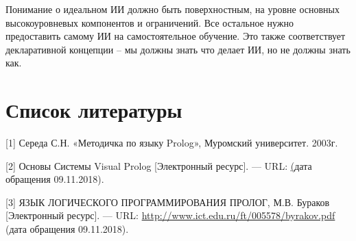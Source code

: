 \documentclass[14pt,a4paper,report]{report}
\begin{document}
Понимание о идеальном ИИ должно быть поверхностным, на уровне основных высокоуровневых компонентов и ограничений. Все остальное нужно предоставить самому ИИ на самостоятельное обучение. Это также соответствует декларативной концепции -- мы должны знать что делает ИИ, но не должны знать как.

\section{Список литературы}


\begin{flushleft}
	
[1] Середа С.Н. «Методичка по языку Prolog», Муромский университет. 2003г.\linebreak

[2] Основы Системы Visual Prolog [Электронный ресурс]. — URL: \href{https://www.visual-prolog.com/default.htm} (дата обращения 09.11.2018). \linebreak
	
[3] ЯЗЫК ЛОГИЧЕСКОГО ПРОГРАММИРОВАНИЯ ПРОЛОГ, М.В. Бураков [Электронный ресурс]. — URL: \href{http://www.ict.edu.ru/ft/005578/byrakov.pdf}{http://www.ict.edu.ru/ft/005578/byrakov.pdf} (дата обращения 09.11.2018). \linebreak

\end{flushleft}
	
\end{document}
